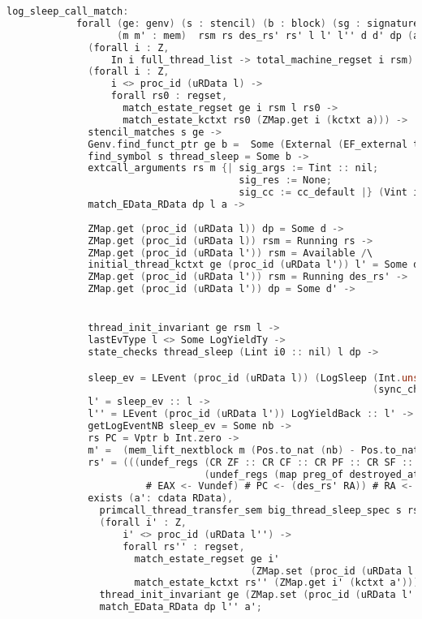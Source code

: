 \begin{lstlisting}[language=C]     
          log_sleep_call_match:
            forall (ge: genv) (s : stencil) (b : block) (sg : signature) 
                   (m m' : mem)  rsm rs des_rs' rs' l l' l'' d d' dp (a: cdata RData) nb sleep_ev i0,
              (forall i : Z,
                  In i full_thread_list -> total_machine_regset i rsm) ->
              (forall i : Z,
                  i <> proc_id (uRData l) ->
                  forall rs0 : regset,
                    match_estate_regset ge i rsm l rs0 ->
                    match_estate_kctxt rs0 (ZMap.get i (kctxt a))) ->
              stencil_matches s ge ->
              Genv.find_funct_ptr ge b =  Some (External (EF_external thread_sleep sg)) ->
              find_symbol s thread_sleep = Some b ->
              extcall_arguments rs m {| sig_args := Tint :: nil;
                                        sig_res := None;
                                        sig_cc := cc_default |} (Vint i0 :: nil) ->
              match_EData_RData dp l a ->
              
              ZMap.get (proc_id (uRData l)) dp = Some d ->
              ZMap.get (proc_id (uRData l)) rsm = Running rs ->
              ZMap.get (proc_id (uRData l')) rsm = Available /\
              initial_thread_kctxt ge (proc_id (uRData l')) l' = Some des_rs' \/
              ZMap.get (proc_id (uRData l')) rsm = Running des_rs' ->
              ZMap.get (proc_id (uRData l')) dp = Some d' ->


              thread_init_invariant ge rsm l ->
              lastEvType l <> Some LogYieldTy ->
              state_checks thread_sleep (Lint i0 :: nil) l dp ->

              sleep_ev = LEvent (proc_id (uRData l)) (LogSleep (Int.unsigned i0) (Mem.nextblock m)
                                                               (sync_chpool_check thread_sleep  (Lint i0 :: nil) (uRData l) d)) ->
              l' = sleep_ev :: l ->
              l'' = LEvent (proc_id (uRData l')) LogYieldBack :: l' ->
              getLogEventNB sleep_ev = Some nb ->
              rs PC = Vptr b Int.zero ->
              m' =  (mem_lift_nextblock m (Pos.to_nat (nb) - Pos.to_nat (Mem.nextblock m) % nat)) ->
              rs' = (((undef_regs (CR ZF :: CR CF :: CR PF :: CR SF :: CR OF :: nil)
                                  (undef_regs (map preg_of destroyed_at_call) des_rs'))
                        # EAX <- Vundef) # PC <- (des_rs' RA)) # RA <- Vundef ->
              exists (a': cdata RData),
                primcall_thread_transfer_sem big_thread_sleep_spec s rs (m, a) rs' (m', a') /\
                (forall i' : Z,
                    i' <> proc_id (uRData l'') ->
                    forall rs'' : regset,
                      match_estate_regset ge i'
                                          (ZMap.set (proc_id (uRData l'')) (Running rs') rsm) l'' rs'' ->
                      match_estate_kctxt rs'' (ZMap.get i' (kctxt a'))) /\
                thread_init_invariant ge (ZMap.set (proc_id (uRData l'')) (Running rs') rsm) l'' /\
                match_EData_RData dp l'' a';
\end{lstlisting}
         
